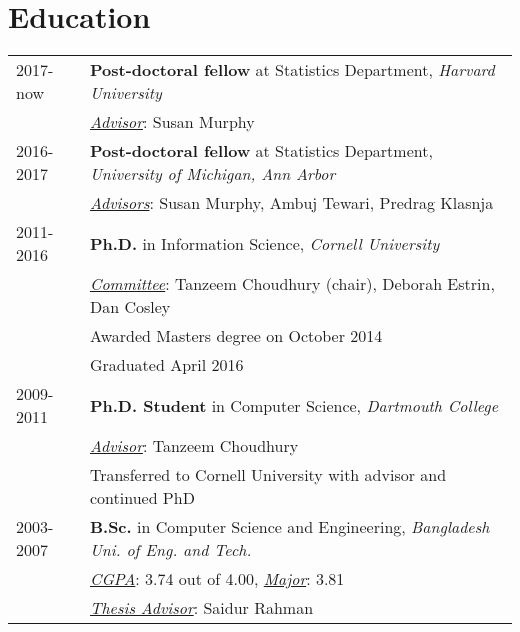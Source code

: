 \documentclass[10pt,fullpage]{article}
\begin{document}
\section*{\textbf{Education}}
\vspace{-1em}
\begin{longtable}{p{0.7in}|p{5.5in}}
		2017-now & {\bf Post-doctoral fellow} at Statistics Department, {\it Harvard University} \\
			& \underline{{\it Advisor}}: Susan Murphy\vspace{0.15cm}\\
	2016-2017 & {\bf Post-doctoral fellow} at Statistics Department, {\it University of Michigan, Ann Arbor} \\
			& \underline{{\it Advisors}}: Susan Murphy, Ambuj Tewari, Predrag Klasnja\vspace{0.15cm}\\	2011-2016 & {\bf Ph.D.} in Information Science, {\it Cornell University} \\
			& \underline{{\it Committee}}: Tanzeem Choudhury (chair), Deborah Estrin, Dan Cosley\\
			& Awarded Masters degree on October 2014 \\
			& Graduated April 2016\vspace{0.15cm}\\
	2009-2011& {\bf Ph.D. Student} in Computer Science, {\it Dartmouth College} \\
			& \underline{{\it Advisor}}: Tanzeem Choudhury \\
			&Transferred to Cornell University with advisor and continued PhD\vspace{0.15cm}\\
	2003-2007 & {\bf B.Sc.} in Computer Science and Engineering, {\it Bangladesh Uni. of Eng. and Tech.}\\
			& \underline{{\it CGPA}}: 3.74 out of 4.00, \underline{{\it Major}}: 3.81\\
			& \underline{{\it Thesis Advisor}}: Saidur Rahman\\
\end{longtable}
\end{document}
